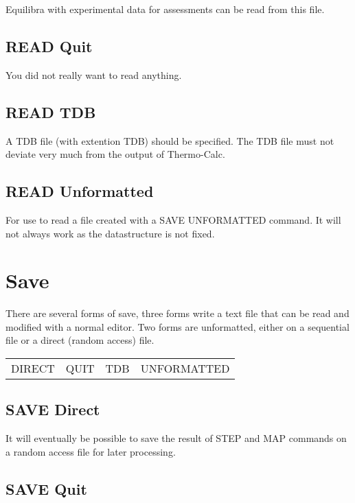 \documentclass[12pt]{article}
\begin{document}
Equilibra with experimental data for assessments can be read from this
file.

\subsection{READ Quit}

You did not really want to read anything.

\subsection{READ TDB}

A TDB file (with extention TDB) should be specified.  The TDB file
must not deviate very much from the output of Thermo-Calc.

\subsection{READ Unformatted}

For use to read a file created with a SAVE UNFORMATTED command.  It
will not always work as the datastructure is not fixed.

\section{Save }

There are several forms of save, three forms write a text file that
can be read and modified with a normal editor.  Two forms are
unformatted, either on a sequential file or a direct (random access)
file.

\begin{tabular}{llll}
 DIRECT          & QUIT    & TDB &         UNFORMATTED\\
\end{tabular}

\subsection{SAVE Direct}

It will eventually be possible to save the result of STEP and MAP
commands on a random access file for later processing.

\subsection{SAVE Quit}
\end{document}
